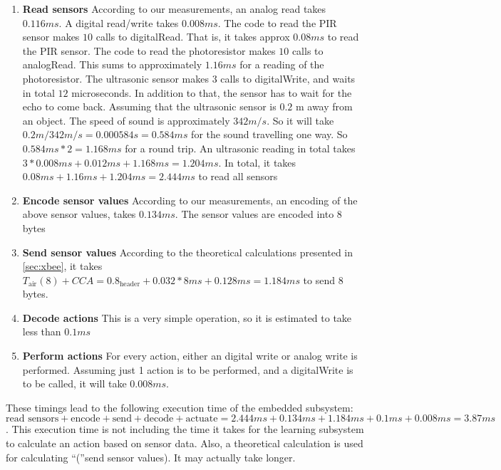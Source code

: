  \begin{enumerate}
  \item \textbf{Read sensors} According to our measurements, an analog read takes $0.116 ms$. A digital read/write takes $0.008 ms$. The code to read the PIR sensor makes $10$ calls to digitalRead. That is, it takes approx $0.08 ms$ to read the PIR sensor. The code to read the photoresistor makes $10$ calls to analogRead. This sums to approximately $1.16 ms$ for a reading of the photoresistor. The ultrasonic sensor makes $3$ calls to digitalWrite, and waits in total $12$ microseconds. In addition to that, the sensor has to wait for the echo to come back. Assuming that the ultrasonic sensor is $0.2$ m away from an object. The speed of sound is approximately $342 m/s$. So it will take $0.2 m / 342 m/s = 0.000584 s = 0.584 ms$ for the sound travelling one way. So $0.584 ms * 2 = 1.168 ms$ for a round trip. An ultrasonic reading in total takes $3 * 0.008 ms + 0.012 ms + 1.168 ms = 1.204 ms$. In total, it takes $0.08 ms + 1.16 ms + 1.204 ms = 2.444 ms$ to read all sensors
  \item \textbf{Encode sensor values} According to our measurements, an encoding of the above sensor values, takes $0.134 ms$. The sensor values are encoded into 8 bytes
  \item \textbf{Send sensor values} According to the theoretical calculations presented in \cref{sec:xbee}, it takes $T_{\text{air}}(8) + CCA = 0.8_{\text{header}} + 0.032*8 ms + 0.128 ms = 1.184 ms$ to send 8 bytes.
  \item \textbf{Decode actions} This is a very simple operation, so it is estimated to take less than $0.1 ms$
  \item \textbf{Perform actions} For every action, either an digital write or analog write is performed. Assuming just 1 action is to be performed, and a digitalWrite is to be called, it will take $0.008 ms$.
\end{enumerate}

These timings lead to the following execution time of the embedded subsystem: $\text{read sensors} + \text{encode} + \text{send} + \text{decode} + \text{actuate} = 2.444 ms + 0.134 ms + 1.184 ms + 0.1 ms + 0.008 ms = 3.87 ms$. This execution time is not including the time it takes for the learning subsystem to calculate an action based on sensor data. Also, a theoretical calculation is used for calculating \enquote(send sensor values). It may actually take longer.
